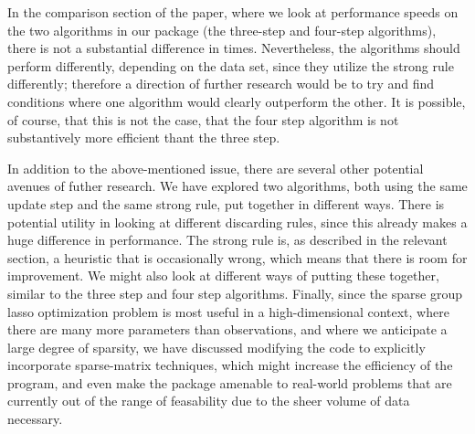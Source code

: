 \documentclass[12pt]{article}
\begin{document}
In the comparison section of the paper, where we look at performance speeds on the two algorithms in our package (the three-step and four-step algorithms), there is not a substantial difference in times. Nevertheless, the algorithms should perform differently, depending on the data set, since they utilize the strong rule differently; therefore a direction of further research would be to try and find conditions where one algorithm would clearly outperform the other. It is possible, of course, that this is not the case, that the four step algorithm is not substantively more efficient thant the three step.

In addition to the above-mentioned issue, there are several other potential avenues of futher research. We have explored two algorithms, both using the same update step and the same strong rule, put together in different ways. There is potential utility in looking at different discarding rules, since this already makes a huge difference in performance. The strong rule is, as described in the relevant section, a heuristic that is occasionally wrong, which means that there is room for improvement. We might also look at different ways of putting these together, similar to the three step and four step algorithms. Finally, since the sparse group lasso optimization problem is most useful in a high-dimensional context, where there are many more parameters than observations, and where we anticipate a large degree of sparsity, we have discussed modifying the code to explicitly incorporate sparse-matrix techniques, which might increase the efficiency of the program, and even make the package amenable to real-world problems that are currently out of the range of feasability due to the sheer volume of data necessary.

 




\end{document}
